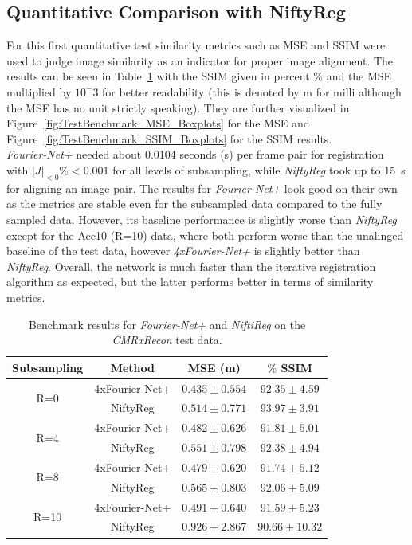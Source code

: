 \documentclass[english,version-2022-01]{uzl-thesis} %
\begin{document}
\subsection{Quantitative Comparison with NiftyReg}  \label{SubSec:ResultsQuantitativeComparisonNiftyReg}
For this first quantitative test similarity metrics such as MSE and SSIM were used to judge image similarity as an indicator for proper image alignment. The results can be seen in Table~\ref{tab:BenchmarkNiftyReg} with the SSIM given in percent $\%$ and the MSE multiplied by $10^-3$ for better readability (this is denoted by m for milli although the MSE has no unit strictly speaking). They are further visualized in Figure~\ref{fig:TestBenchmark_MSE_Boxplots} for the MSE and Figure~\ref{fig:TestBenchmark_SSIM_Boxplots} for the SSIM results. \\ \emph{Fourier-Net+} needed about 0.0104 seconds (s) per frame pair for registration with $|J|_{<0}\% < 0.001$ for all levels of subsampling, while \emph{NiftyReg} took up to 15~s for aligning an image pair. The results for \emph{Fourier-Net+} look good on their own as the metrics are stable even for the subsampled data compared to the fully sampled data. However, its baseline performance is slightly worse than \emph{NiftyReg} except for the Acc10 (R=10) data, where both perform worse than the unalinged baseline of the test data, however \emph{4xFourier-Net+} is slightly better than \emph{NiftyReg}. Overall, the network is much faster than the iterative registration algorithm as expected, but the latter performs better in terms of similarity metrics.

\begin{table}[htpb]
	\centering
	\caption{Benchmark results for \emph{Fourier-Net+} and \emph{NiftiReg} on the \emph{CMRxRecon} test data.}
	\label{tab:BenchmarkNiftyReg}
	\begin{tabular}{c c c c} %
		\toprule
		Subsampling & Method & MSE (m) & $\%$ SSIM \\
		
		\midrule
		\multirow{2}{*}{R=0} & 4xFourier-Net+ & $0.435 \pm 0.554$ &  $92.35 \pm 4.59$\\   
		 & NiftyReg & $0.514 \pm 0.771$ & $93.97 \pm 3.91$ \\
		
		\midrule
		\multirow{2}{*}{R=4} & 4xFourier-Net+ & $0.482 \pm 0.626$ & $91.81 \pm 5.01$\\ 
		 & NiftyReg & $0.551 \pm 0.798$ & $92.38 \pm 4.94$ \\
		
		\midrule
		\multirow{2}{*}{R=8} & 4xFourier-Net+ & $0.479 \pm 0.620$ & $91.74 \pm 5.12$\\ 
		 & NiftyReg & $0.565 \pm 0.803$ & $92.06 \pm 5.09$ \\

		\midrule
		\multirow{2}{*}{R=10} & 4xFourier-Net+ & $0.491 \pm 0.640$ & $91.59 \pm 5.23$\\  
		 & NiftyReg & $0.926 \pm 2.867$ & $90.66 \pm 10.32$ \\
		\bottomrule
	\end{tabular}
\end{table}
\end{document}
